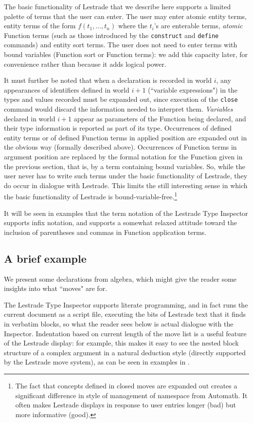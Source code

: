 \documentclass{article}
\begin{document}
The basic functionality of Lestrade that we describe here supports a limited palette of terms that the user can enter.  The user may enter atomic entity terms,
entity terms of the form $f(t_1,\ldots,t_n)$ where the $t_i$'s are enterable terms, {\em atomic\/} Function terms (such as those introduced by the {\tt construct} and {\tt define} commands) and entity sort terms.  The user does not need to enter terms with bound variables (Function sort or Function terms):  we add this capacity later, for convenience rather than because it adds logical power. 

It must further be noted that when a declaration is recorded in world $i$, any appearances of identifiers defined in world $i+1$ (``variable expressions") in the types and values recorded must be expanded out, since
execution of the {\tt close} command would discard the information needed to interpret them.  {\em Variables\/} declared in world $i+1$ appear as parameters of the Function being declared, and their type information is reported as part of its type.   Occurrences of defined entity terms or of defined Function terms in applied position are expanded out in the obvious way (formally described above).   Occurrences of Function terms in argument position are replaced by the formal notation for the Function given in the previous section, that is, by a term containing bound variables.  So, while the user never has to write such terms under the basic functionality of Lestrade, they do occur in dialogue with Lestrade.  This limits the still interesting sense in which the basic functionality of Lestrade is bound-variable-free.\footnote{The fact that concepts defined in closed moves are expanded out creates a significant difference in style of management of namespace from Automath.  It often makes Lestrade displays in response to user entries longer (bad) but more informative (good).}

It will be seen in examples that the term notation of the Lestrade Type Inspector supports infix notation, and supports a somewhat relaxed attitude toward the inclusion of parentheses and commas in Function application terms.


\subsection{A brief example}

We present some declarations from algebra, which might give the reader some insights into what ``moves" are for.

The Lestrade Type Inspector supports literate programming, and in fact runs the current document as a script file, executing the bits of Lestrade text that it finds in verbatim blocks, so what the reader sees below is actual dialogue with the Inspector.  Indentation based on current length of the move list is a useful feature of the Lestrade display:  for example, this makes it easy to see the nested block structure of a complex argument in a natural deduction style (directly supported by the Lestrade move system), as can be seen in examples in \cite{lestrademanual}.
\end{document}
